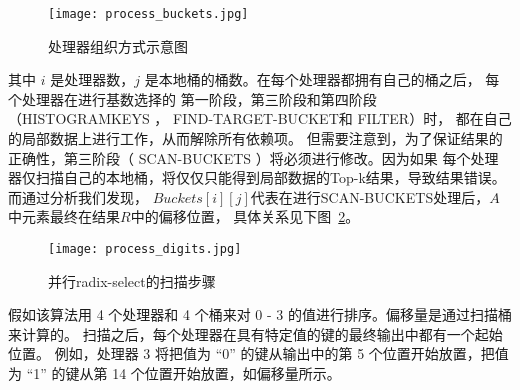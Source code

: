 \begin{figure}[ht]
    \centering
    \texttt{[image: process\_buckets.jpg]}
    \caption{处理器组织方式示意图}
    \label{fig:process_bucket}
\end{figure}

其中 $i$ 是处理器数，$j$ 是本地桶的桶数。在每个处理器都拥有自己的桶之后，
每个处理器在进行基数选择的
第一阶段，第三阶段和第四阶段（HISTOGRAMKEYS ， FIND-TARGET-BUCKET和 FILTER）时，
都在自己的局部数据上进行工作，从而解除所有依赖项。
但需要注意到，为了保证结果的正确性，第三阶段（ SCAN-BUCKETS ）将必须进行修改。因为如果
每个处理器仅扫描自己的本地桶，将仅仅只能得到局部数据的Top-k结果，导致结果错误。而通过分析我们发现，
$Buckets[i][j]$代表在进行SCAN-BUCKETS处理后，$A$中元素最终在结果$R$中的偏移位置，
具体关系见下图~\ref{fig:digits}。
\begin{figure}[ht]
    \centering
    \texttt{[image: process\_digits.jpg]}
    \caption{并行radix-select的扫描步骤}
    \label{fig:digits}
\end{figure}

假如该算法用 4 个处理器和 4 个桶来对 0 - 3 的值进行排序。偏移量是通过扫描桶来计算的。
扫描之后，每个处理器在具有特定值的键的最终输出中都有一个起始位置。
例如，处理器 3 将把值为 “0” 的键从输出中的第 5 个位置开始放置，把值为 “1” 的键从第 14 个位置开始放置，如偏移量所示。

